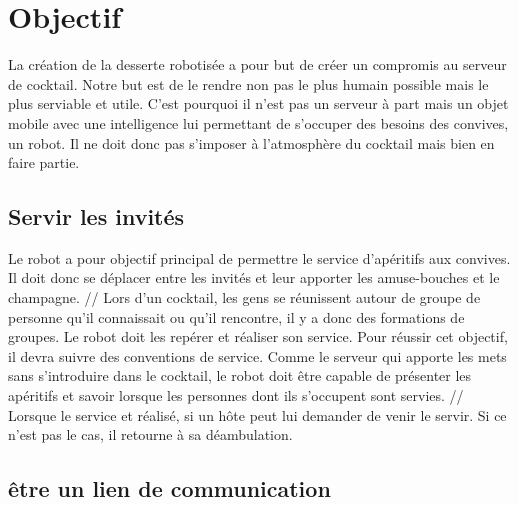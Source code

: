  
\chapter{Objectif}

La création de la desserte robotisée a pour but de créer un compromis au serveur de cocktail. Notre but est de le rendre non pas le plus humain possible mais le plus serviable et utile. C’est pourquoi il n’est pas un serveur à part mais un objet mobile avec une intelligence lui permettant de s’occuper des besoins des convives, un robot. Il ne doit donc pas s’imposer à l’atmosphère du cocktail mais bien en faire partie.

\section{Servir les invités}

Le robot a pour objectif principal de permettre le service d’apéritifs aux convives. Il doit donc se déplacer entre les invités et leur apporter les amuse-bouches et le champagne.
//
Lors d’un cocktail, les gens se réunissent autour de groupe de personne qu’il connaissait ou qu’il rencontre, il y a donc des formations de groupes. Le robot doit les repérer et réaliser son service. Pour réussir cet objectif, il devra suivre des conventions de service. Comme le serveur qui apporte les mets sans s’introduire dans le cocktail, le robot doit être capable de présenter les apéritifs et savoir lorsque les personnes dont ils s’occupent sont servies. 
//
Lorsque le service et réalisé, si un hôte peut lui demander de venir le servir. Si ce n’est pas le cas, il retourne à sa déambulation.


\section{être un lien de communication}

